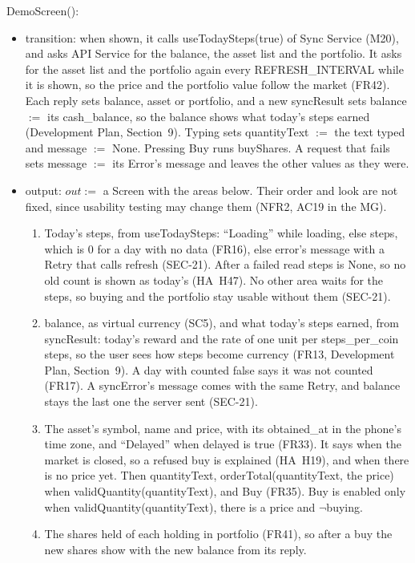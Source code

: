 \documentclass[12pt, titlepage]{article}
\begin{document}
\noindent DemoScreen():
\begin{itemize}
\item transition: when shown, it calls useTodaySteps(true) of Sync Service
  (M20), and asks API Service for the balance, the asset list and the
  portfolio. It asks for the asset list and the portfolio again every
  REFRESH\_INTERVAL while it is shown, so the price and the portfolio value
  follow the market (FR42). Each reply sets balance, asset or portfolio, and
  a new syncResult sets balance $:=$ its cash\_balance, so the balance shows
  what today's steps earned (Development Plan, Section~9).
  Typing sets quantityText $:=$ the text typed and message $:=$ None. Pressing
  Buy runs buyShares. A request that fails sets message $:=$ its Error's
  message and leaves the other values as they were.
\item output: $out :=$ a Screen with the areas below. Their order and look
  are not fixed, since usability testing may change them (NFR2, AC19 in the
  MG).
  \begin{enumerate}
  \item Today's steps, from useTodaySteps: ``Loading'' while loading, else
    steps, which is 0 for a day with no data (FR16), else error's message
    with a Retry that calls refresh (SEC-21). After a failed read steps is
    None, so no old count is shown as today's (HA~H47). No other area waits
    for the steps, so buying and the portfolio stay usable without them
    (SEC-21).
  \item balance, as virtual currency (SC5), and what today's steps earned,
    from syncResult: today's reward and the rate of one unit per
    steps\_per\_coin steps, so the user sees how steps become currency
    (FR13, Development Plan, Section~9). A day with counted false says it was
    not counted (FR17). A syncError's message comes with the same Retry, and balance stays the
    last one the server sent (SEC-21).
  \item The asset's symbol, name and price, with its obtained\_at in the
    phone's time zone, and ``Delayed'' when delayed is true (FR33). It says
    when the market is closed, so a refused buy is explained (HA~H19), and
    when there is no price yet. Then quantityText, orderTotal(quantityText,
    the price) when validQuantity(quantityText), and Buy (FR35). Buy is
    enabled only when validQuantity(quantityText), there is a price and
    $\neg$buying.
  \item The shares held of each holding in portfolio (FR41), so after a buy
    the new shares show with the new balance from its reply.

\end{enumerate}
\end{itemize}
\end{document}
